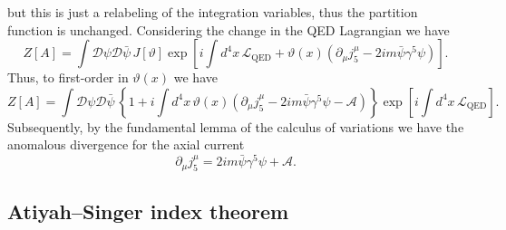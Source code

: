 \documentclass[11pt, a4paper]{article}
\begin{document}
but this is just a relabeling of the integration variables, thus the partition
function is unchanged. Considering the change in the QED Lagrangian we have
\begin{equation}
  Z[A] = \int{\mathcal{D}\psi\mathcal{D}\bar{\psi}\,J[\vartheta]
    \exp{ \left[i \int{d^4x\, \mathcal{L}_{\mathrm{QED}} + \vartheta(x)(\partial_\mu j^\mu_5
- 2im\bar{\psi}\gamma^5\psi) }  \right] } }.
\end{equation}
Thus, to first-order in $\vartheta(x)$ we have
\begin{equation}
   Z[A] = \int{\mathcal{D}\psi\mathcal{D}\bar{\psi}\, \left\{1 + i\int{d^4x\,
     \vartheta(x)(\partial_\mu j^\mu_5 - 2im\bar{\psi}\gamma^5\psi -\mathcal{A})} \right\}
   \exp{\left[ i\int{d^4x\, \mathcal{L}_{\mathrm{QED}} } \right]}}.
\end{equation}
Subsequently, by the fundamental lemma of the calculus of variations we have
the anomalous divergence for the axial current
\begin{equation}
  \partial_\mu j^\mu_5 = 2im\bar{\psi}\gamma^5\psi + \mathcal{A}.
\end{equation}


\subsection{Atiyah–Singer index theorem}
\end{document}
